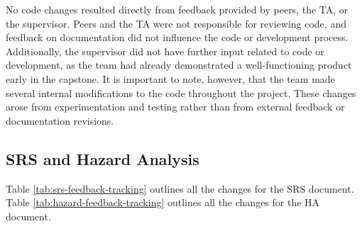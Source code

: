 \documentclass{article}
\begin{document}
No code changes resulted directly from feedback provided by peers, the TA, or
the supervisor. Peers and the TA were not responsible for reviewing code, and
feedback on documentation did not influence the code or development process.
Additionally, the supervisor did not have further input related to code or
development, as the team had already demonstrated a well-functioning product
early in the capstone. It is important to note, however, that the team made
several internal modifications to the code throughout the project. These
changes arose from experimentation and testing rather than from external
feedback or documentation revisions.

\subsection{SRS and Hazard Analysis}

Table \ref{tab:srs-feedback-tracking} outlines all the changes for the SRS
document.
Table \ref{tab:hazard-feedback-tracking} outlines all the changes for the HA
document.
\end{document}
